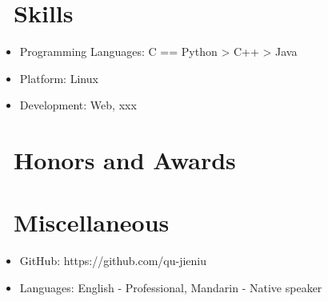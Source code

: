 \documentclass{resume}
\begin{document}
\section{\faCogs\ Skills}
\begin{itemize}[parsep=0.5ex]
  \item Programming Languages: C == Python > C++ > Java
  \item Platform: Linux
  \item Development: Web, xxx
\end{itemize}


\section{\faHeartO\ Honors and Awards}


\section{\faInfo\ Miscellaneous}
\begin{itemize}[parsep=0.5ex]
  \item GitHub: https://github.com/qu-jieniu
  \item Languages: English - Professional, Mandarin - Native speaker
\end{itemize}
\end{document}
